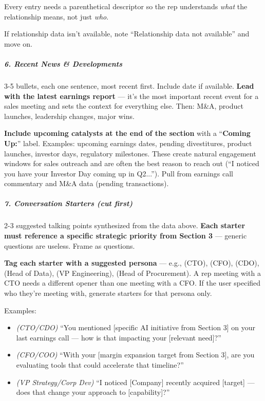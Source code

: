 \documentclass[11pt]{article}
\begin{document}
Every entry needs a parenthetical descriptor so the rep understands \emph{what} the relationship means, not just \emph{who}.


If relationship data isn't available, note ``Relationship data not available'' and move on.


\subparagraph{6. Recent News \& Developments}\mbox{}\par
3-5 bullets, each one sentence, most recent first. Include date if available. \textbf{Lead with the latest earnings report} — it's the most important recent event for a sales meeting and sets the context for everything else. Then: M\&A, product launches, leadership changes, major wins.


\textbf{Include upcoming catalysts at the end of the section} with a ``\textbf{Coming Up:}'' label. Examples: upcoming earnings dates, pending divestitures, product launches, investor days, regulatory milestones. These create natural engagement windows for sales outreach and are often the best reason to reach out (``I noticed you have your Investor Day coming up in Q2...''). Pull from earnings call commentary and M\&A data (pending transactions).


\subparagraph{7. Conversation Starters (cut first)}\mbox{}\par
2-3 suggested talking points synthesized from the data above. \textbf{Each starter must reference a specific strategic priority from Section 3} — generic questions are useless. Frame as questions.


\textbf{Tag each starter with a suggested persona} — e.g., (CTO), (CFO), (CDO), (Head of Data), (VP Engineering), (Head of Procurement). A rep meeting with a CTO needs a different opener than one meeting with a CFO. If the user specified who they're meeting with, generate starters for that persona only.


Examples:

\begin{itemize}[leftmargin=*,itemsep=2pt,topsep=2pt]
\item {} \emph{(CTO/CDO)} ``You mentioned [specific AI initiative from Section 3] on your last earnings call — how is that impacting your [relevant need]?''
\item {} \emph{(CFO/COO)} ``With your [margin expansion target from Section 3], are you evaluating tools that could accelerate that timeline?''
\item {} \emph{(VP Strategy/Corp Dev)} ``I noticed [Company] recently acquired [target] — does that change your approach to [capability]?''
\end{itemize}
\end{document}

